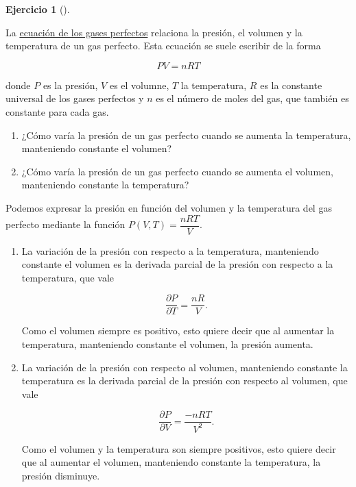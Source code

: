\documentclass[
  a4paper,
]{scrreport}
\theoremstyle{definition}
\newtheorem{exercise}{Ejercicio}[chapter]
\theoremstyle{remark}
\begin{document}
\begin{exercise}[]\protect\hypertarget{exr-derivada-parcial-gases-perfectos}{}\label{exr-derivada-parcial-gases-perfectos}

La
\href{https://es.wikipedia.org/wiki/Ley_de_los_gases_ideales}{ecuación
de los gases perfectos} relaciona la presión, el volumen y la
temperatura de un gas perfecto. Esta ecuación se suele escribir de la
forma

\[
PV = nRT
\]

donde \(P\) es la presión, \(V\) es el volumne, \(T\) la temperatura,
\(R\) es la constante universal de los gases perfectos y \(n\) es el
número de moles del gas, que también es constante para cada gas.

\begin{enumerate}
\def\labelenumi{\alph{enumi}.}
\item
  ¿Cómo varía la presión de un gas perfecto cuando se aumenta la
  temperatura, manteniendo constante el volumen?
\item
  ¿Cómo varía la presión de un gas perfecto cuando se aumenta el
  volumen, manteniendo constante la temperatura?
\end{enumerate}

\end{exercise}

\begin{tcolorbox}[enhanced jigsaw, left=2mm, coltitle=black, colbacktitle=quarto-callout-tip-color!10!white, opacitybacktitle=0.6, colback=white, breakable, titlerule=0mm, toptitle=1mm, rightrule=.15mm, bottomtitle=1mm, bottomrule=.15mm, toprule=.15mm, leftrule=.75mm, arc=.35mm, opacityback=0, title=\textcolor{quarto-callout-tip-color}{\faLightbulb}\hspace{0.5em}{Solución}, colframe=quarto-callout-tip-color-frame]

Podemos expresar la presión en función del volumen y la temperatura del
gas perfecto mediante la función \(P(V,T) = \dfrac{nRT}{V}\).

\begin{enumerate}
\def\labelenumi{\alph{enumi}.}
\item
  La variación de la presión con respecto a la temperatura, manteniendo
  constante el volumen es la derivada parcial de la presión con respecto
  a la temperatura, que vale

  \[
  \frac{\partial P}{\partial T} = \frac{nR}{V}.
  \]

  Como el volumen siempre es positivo, esto quiere decir que al aumentar
  la temperatura, manteniendo constante el volumen, la presión aumenta.
\item
  La variación de la presión con respecto al volumen, manteniendo
  constante la temperatura es la derivada parcial de la presión con
  respecto al volumen, que vale

  \[
  \frac{\partial P}{\partial V} = \frac{-nRT}{V^2}.
  \]

  Como el volumen y la temperatura son siempre positivos, esto quiere
  decir que al aumentar el volumen, manteniendo constante la
  temperatura, la presión disminuye.
\end{enumerate}

\end{tcolorbox}
\end{document}
